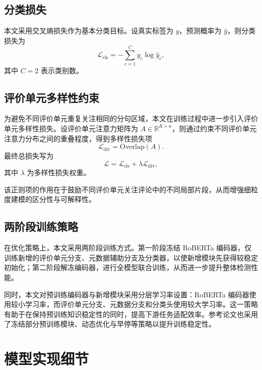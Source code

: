 \documentclass[UTF8,oneside,openright,fontset=none]{ctexbook}
\numberwithin{equation}{chapter}
\begin{document}
\subsection{分类损失}

本文采用交叉熵损失作为基本分类目标。设真实标签为 $y$，预测概率为 $\hat{y}$，则分类损失为
\begin{equation}
  \mathcal{L}_{\mathrm{cls}} = - \sum_{c=1}^{C} y_c \log \hat{y}_c,
\end{equation}
其中 $C=2$ 表示类别数。

\subsection{评价单元多样性约束}

为避免不同评价单元重复关注相同的分句区域，本文在训练过程中进一步引入评价单元多样性损失。设评价单元注意力矩阵为 $A\in\mathbb{R}^{K\times n}$，则通过约束不同评价单元注意力分布之间的重叠程度，得到多样性损失项
\begin{equation}
  \mathcal{L}_{\mathrm{div}} = \mathrm{Overlap}(A).
\end{equation}
最终总损失写为
\begin{equation}
  \mathcal{L} = \mathcal{L}_{\mathrm{cls}} + \lambda \mathcal{L}_{\mathrm{div}},
\end{equation}
其中 $\lambda$ 为多样性损失权重。

该正则项的作用在于鼓励不同评价单元关注评论中的不同局部片段，从而增强细粒度建模的区分性与可解释性。

\subsection{两阶段训练策略}

在优化策略上，本文采用两阶段训练方式。第一阶段冻结 RoBERTa 编码器，仅训练新增的评价单元分支、元数据辅助分支及分类器，以使新增模块先获得较稳定初始化；第二阶段解冻编码器，进行全模型联合训练，从而进一步提升整体检测性能。

同时，本文对预训练编码器与新增模块采用分层学习率设置：RoBERTa 编码器使用较小学习率，而评价单元分支、元数据分支和分类头使用较大学习率。这一策略有助于在保持预训练知识稳定性的同时，提高下游任务适配效率。参考论文也采用了冻结部分预训练模块、动态优化与早停等策略以提升训练稳定性。

\section{模型实现细节}
\end{document}

